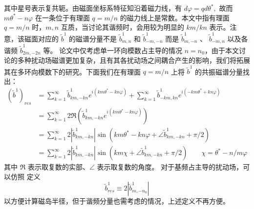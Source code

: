 其中星号表示复共轭。由磁面坐标系特征知沿着磁力线，有 $d \varphi=q d \theta^{*},$ 故而 $m \theta^{*}-n \varphi$ 在一条位于有理面 $q=m / n$ 的磁力线上是常数。本文中指有理面 $q=m/n$ 时，$m,n$ 互质，当讨论其谐频时，会用较为明显的 $km/kn$ 表示。注意，该磁面对应的 $\tilde{b}^{1}$ 的磁谱分量不是 $\tilde{b}_{m,n}^{1}$ 和 $\tilde{b}_{-m,-n}^{1}$ 而是 $\tilde{b}_{m,-n}^{1}$ 、 $\tilde{b}_{-m, n}^{1}$ 以及各谐频 $\tilde{b}_{2 m,-2 n}^{1}$ 等。 \cite{nardon_edge_2007} 论文中仅考虑单一环向模数占主导的情况 $n=n_0$，由于本文讨论的多种扰动场磁谱更加复杂，且有其各扰动场之间耦合产生的影响，我们将拓展其在多环向模数下的研究。下面我们在有理面 $q=m/n$ 上将 $\tilde{b}^{1}$ 的共振磁谱分量找出：
\begin{equation}
\begin{aligned}
  \left(\tilde{b}^{1}\right)_{r e s} &=\sum_{k=1}^{\infty} \tilde{b}_{km,-kn}^{1} e^{i\left(km \theta^{*}-kn \varphi\right)}+ \sum_{k=1}^{\infty}  \tilde{b}_{-km, kn}^{1} e^{i\left(-km \theta^{*}+kn \varphi\right)} \\
  &= \sum_{k=1}^{\infty}  2 \Re\left(\tilde{b}_{km,-kn}^{1} e^{i\left(km \theta^{*}-kn \varphi\right)}\right) \\
  &=\sum_{k=1}^{\infty}  2\left|\tilde{b}_{km,-kn}^{1}\right| \sin \left(km \theta^{*}-kn\varphi + \angle\tilde{b}_{km,-kn}^{1} + \pi/2 \right)\\
  &=\sum_{k=1}^{\infty}  2\left|\tilde{b}_{km,-kn}^{1}\right| \sin \left(km\chi + \angle\tilde{b}_{km,-kn}^{1} + \pi/2 \right)\qquad \chi = \theta^*- n/m \varphi
  \end{aligned}
\end{equation}
其中 $\Re$ 表示取复数的实部、$\angle $ 表示取复数的角度。 对于基频占主导的扰动场，可以仿照 \cite{nardon_edge_2007} 定义
\begin{equation}
  \tilde{b}_{res}^{1} \equiv 2\left|\tilde{b}_{m,-n_{0}}^{1}\right|
\end{equation}
以方便计算磁岛半径，但于谐频分量也需考虑的情况，上述定义不再方便。


